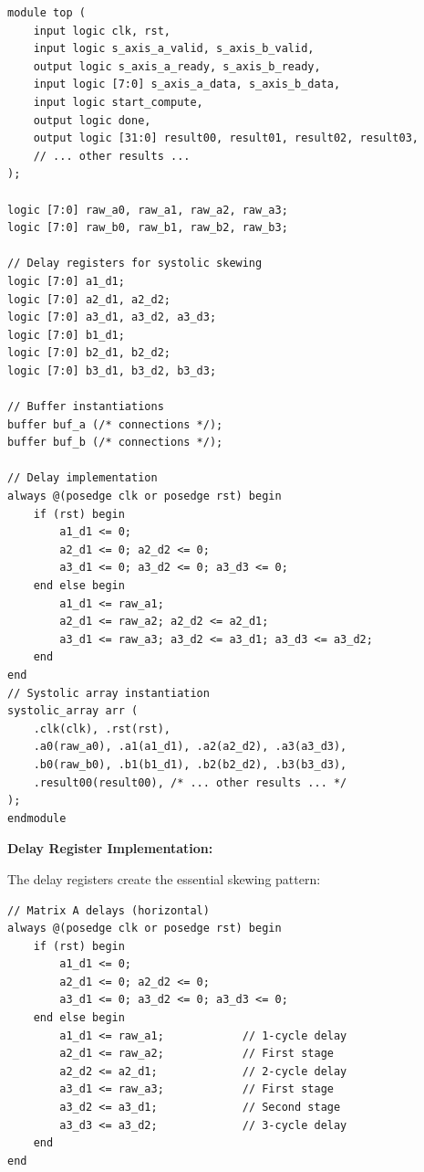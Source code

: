 \documentclass[12pt,a4paper]{article}
\begin{document}
\begin{lstlisting}[style=verilog,caption={Top-Level Integration with Skewing Logic (Excerpt)},label={lst:top}]
module top (
    input logic clk, rst,
    input logic s_axis_a_valid, s_axis_b_valid,
    output logic s_axis_a_ready, s_axis_b_ready,
    input logic [7:0] s_axis_a_data, s_axis_b_data,
    input logic start_compute,
    output logic done,
    output logic [31:0] result00, result01, result02, result03,
    // ... other results ...
);

logic [7:0] raw_a0, raw_a1, raw_a2, raw_a3;
logic [7:0] raw_b0, raw_b1, raw_b2, raw_b3;

// Delay registers for systolic skewing
logic [7:0] a1_d1;
logic [7:0] a2_d1, a2_d2;
logic [7:0] a3_d1, a3_d2, a3_d3;
logic [7:0] b1_d1;
logic [7:0] b2_d1, b2_d2;
logic [7:0] b3_d1, b3_d2, b3_d3;

// Buffer instantiations
buffer buf_a (/* connections */);
buffer buf_b (/* connections */);

// Delay implementation
always @(posedge clk or posedge rst) begin
    if (rst) begin
        a1_d1 <= 0;
        a2_d1 <= 0; a2_d2 <= 0;
        a3_d1 <= 0; a3_d2 <= 0; a3_d3 <= 0;
    end else begin
        a1_d1 <= raw_a1;
        a2_d1 <= raw_a2; a2_d2 <= a2_d1;
        a3_d1 <= raw_a3; a3_d2 <= a3_d1; a3_d3 <= a3_d2;
    end
end
// Systolic array instantiation
systolic_array arr (
    .clk(clk), .rst(rst),
    .a0(raw_a0), .a1(a1_d1), .a2(a2_d2), .a3(a3_d3),
    .b0(raw_b0), .b1(b1_d1), .b2(b2_d2), .b3(b3_d3),
    .result00(result00), /* ... other results ... */
);
endmodule
\end{lstlisting}

\textbf{Delay Register Implementation:}

The delay registers create the essential skewing pattern:

\begin{lstlisting}[style=verilog]
// Matrix A delays (horizontal)
always @(posedge clk or posedge rst) begin
    if (rst) begin
        a1_d1 <= 0;
        a2_d1 <= 0; a2_d2 <= 0;
        a3_d1 <= 0; a3_d2 <= 0; a3_d3 <= 0;
    end else begin
        a1_d1 <= raw_a1;            // 1-cycle delay
        a2_d1 <= raw_a2;            // First stage
        a2_d2 <= a2_d1;             // 2-cycle delay
        a3_d1 <= raw_a3;            // First stage
        a3_d2 <= a3_d1;             // Second stage
        a3_d3 <= a3_d2;             // 3-cycle delay
    end
end
\end{lstlisting}
\end{document}
